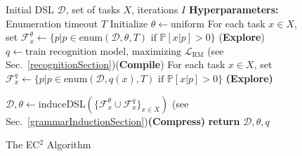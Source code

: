 \documentclass{article}
\newcommand{\system}{\textsc{EC$^2$} }
\newcommand{\probability}{\mathds{P}} %
\begin{document}
\begin{figure}[h]
\centering  \begin{minipage}{0.9\textwidth}    
    \begin{algorithm}[H]
      \caption{The \system Algorithm}
      \label{mainAlgorithm}
      \begin{algorithmic}
         Initial DSL $\mathcal{D}$, set of tasks $X$, iterations $I$
        \STATE \textbf{Hyperparameters:} Enumeration timeout $T$
        \STATE Initialize $\theta\gets \text{uniform}$ %
        \STATE For each task $x\in X$, set  $\mathcal{F}^{\theta}_x\gets \{p| p\in
        \text{enum}(\mathcal{D},\theta,T)\text{ if }\probability[x|p] > 0\}$
        \hfill(\textbf{Explore})
        \STATE $q\gets \text{train recognition model, maximizing }\mathcal{L}_{\text{RM}}$ (see Sec.~\ref{recognitionSection})\hfill(\textbf{Compile})
        \STATE For each task $x\in X$, set $\mathcal{F}^{q}_x\gets\{p|p\in
        \text{enum}(\mathcal{D},q(x),T)\text{ if }\probability[x|p] > 0\}$
        \hfill\textbf{(Explore)}
        
        \STATE $\mathcal{D},\theta\gets $induceDSL$(\{\mathcal{F}^{\theta}_x\cup\mathcal{F}^{q}_x\}_{x\in X})$  (see Sec.~\ref{grammarInductionSection})\hfill\textbf{(Compress)}
        \ENDFOR
        \STATE \textbf{return} $\mathcal{D},\theta,q$
      \end{algorithmic}
    \end{algorithm}
  \end{minipage}
\end{figure}


\end{document}

